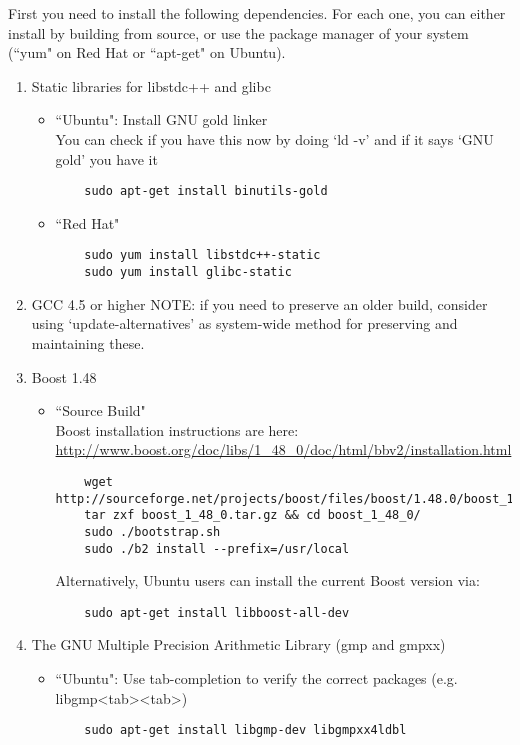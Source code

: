 First you need to install the following dependencies. For each one, you can either install by building from source,
or use the package manager of your system (``yum" on Red Hat or ``apt-get" on Ubuntu).  

\begin{enumerate}
  \item Static libraries for libstdc++ and glibc

  \begin{itemize}
    \item ``Ubuntu": Install GNU gold linker \\
    You can check if you have this now by doing `ld -v' and if it says `GNU gold' you have it
    \begin{lstlisting}
    sudo apt-get install binutils-gold
    \end{lstlisting}

    \item ``Red Hat"
    \begin{lstlisting}
    sudo yum install libstdc++-static 
    sudo yum install glibc-static
    \end{lstlisting}
  \end{itemize}
  
  \item GCC 4.5 or higher
  NOTE: if you need to preserve an older build, consider using `update-alternatives' as system-wide method for preserving and maintaining these.

  \item Boost 1.48
  \begin{itemize}
    \item ``Source Build" \\
    Boost installation instructions are here: \\
    \url{http://www.boost.org/doc/libs/1_48_0/doc/html/bbv2/installation.html}
    \begin{lstlisting}
    wget http://sourceforge.net/projects/boost/files/boost/1.48.0/boost_1_48_0.tar.gz
    tar zxf boost_1_48_0.tar.gz && cd boost_1_48_0/
    sudo ./bootstrap.sh
    sudo ./b2 install --prefix=/usr/local
    \end{lstlisting}
    Alternatively, Ubuntu users can install the current Boost version via:
    \begin{lstlisting}
    sudo apt-get install libboost-all-dev
    \end{lstlisting}
  \end{itemize}

  \item The GNU Multiple Precision Arithmetic Library (gmp and gmpxx)    
  \begin{itemize}
    \item ``Ubuntu": Use tab-completion to verify the correct packages (e.g. libgmp\textless tab\textgreater \textless tab\textgreater)
    \begin{lstlisting}
    sudo apt-get install libgmp-dev libgmpxx4ldbl
    \end{lstlisting}


\end{itemize}
\end{enumerate}
